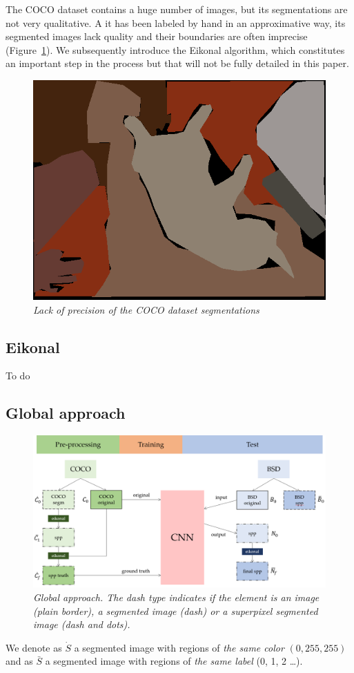 \documentclass{article}
\begin{document}
        \noindent The COCO dataset contains a huge number of images, but its segmentations are not very qualitative. A it has been labeled by hand in an approximative way, its segmented images lack quality and their boundaries are often imprecise (Figure~\ref{fig:imprecise}). We subsequently introduce the Eikonal algorithm, which constitutes an important step in the process but that will not be fully detailed in this paper.

        \begin{figure}[!ht]
            \centering
            \includegraphics[width=0.3\linewidth]{pics/img_segm_coco.png}
            \caption{\textit{Lack of precision of the COCO dataset segmentations}}
            \label{fig:imprecise}
        \end{figure}

    \subsection{Eikonal}
        To do
    \subsection{Global approach}
        \begin{figure}[!ht]
            \centering
            \includegraphics[width=\linewidth]{pics/schema-global.png}
            \caption{\textit{Global approach. The dash type indicates if the element is an image (plain border), a segmented image (dash) or a superpixel segmented image (dash and dots).}}
        \end{figure}
        \par
        We denote as $\dot S$ a segmented image with regions of \textit{the same color} $(0, 255, 255)$  and as $\bar S$ a segmented image with regions of \textit{the same label} (0, 1, 2 \dots).
\end{document}
